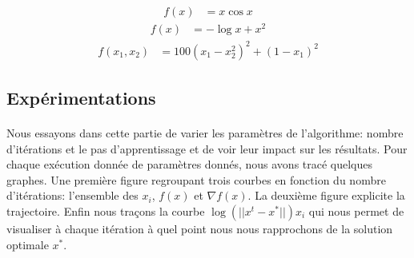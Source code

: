 \documentclass{report}
\begin{document}
\begin{align}
f(x) &= x \cos{x}
\end{align}
\begin{align}
f(x) &= -\log{x}+x^2
\end{align}
\begin{align}
f(x_1,x_2) &= 100(x_1-x_2^2)^2+(1-x_1)^2
\end{align}
\subsection{Expérimentations}
\paragraph{}
Nous essayons dans cette partie de varier les paramètres de l'algorithme: nombre d'itérations et le pas d'apprentissage et de voir leur impact sur les résultats. Pour chaque exécution donnée de paramètres donnés, nous avons tracé quelques graphes. Une première figure regroupant trois courbes en fonction du nombre d'itérations: l'ensemble des $ x_{i} $, $f(x)$ et $\nabla f(x)$. La deuxième figure explicite la trajectoire. Enfin nous traçons la courbe $ \log(||x^t-x^*||) x_{i} $ qui nous permet de visualiser à chaque itération à quel point nous nous rapprochons de la solution optimale $x^*$.
 
\end{document}
